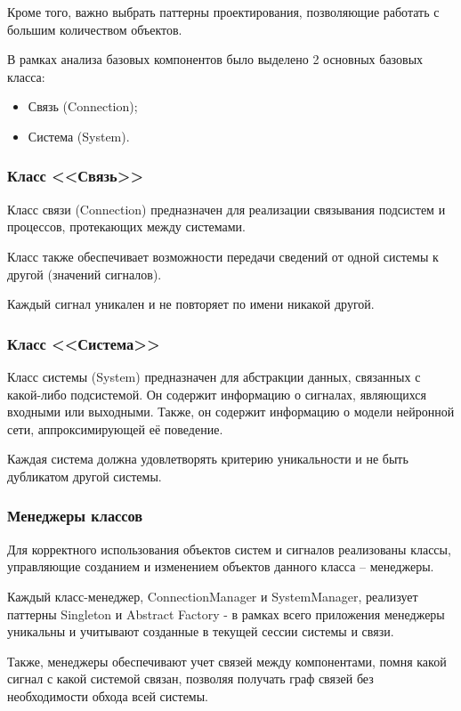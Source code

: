Кроме того, важно выбрать паттерны проектирования, позволяющие работать с большим количеством объектов. 

В рамках анализа базовых компонентов было выделено 2 основных базовых класса: 

\begin{itemize}
  \item Связь (Connection);
  \item Система (System). 
\end{itemize}

\subsubsection{Класс <<Связь>>}

Класс связи (Connection) предназначен для реализации связывания подсистем и процессов, протекающих между системами. 

Класс также обеспечивает возможности передачи сведений от одной системы к другой (значений сигналов). 

Каждый сигнал уникален и не повторяет по имени никакой другой.

\subsubsection{Класс <<Система>>}

Класс системы (System) предназначен для абстракции данных, связанных с
какой-либо подсистемой. Он содержит информацию о сигналах, являющихся входными
или выходными. Также, он содержит информацию о модели нейронной сети,
аппроксимирующей её поведение. 

Каждая система должна удовлетворять критерию уникальности и не быть дубликатом
другой системы. 

\subsubsection{Менеджеры классов}

Для корректного использования объектов систем и сигналов
реализованы классы, управляющие созданием и изменением объектов данного
класса – менеджеры. 

Каждый класс-менеджер, ConnectionManager и SystemManager, реализует паттерны
Singleton и Abstract Factory - в рамках всего приложения менеджеры уникальны и
учитывают созданные в текущей сессии системы и связи. 

Также, менеджеры обеспечивают учет связей между компонентами, помня какой
сигнал с какой системой связан, позволяя получать граф связей без необходимости
обхода всей системы.

